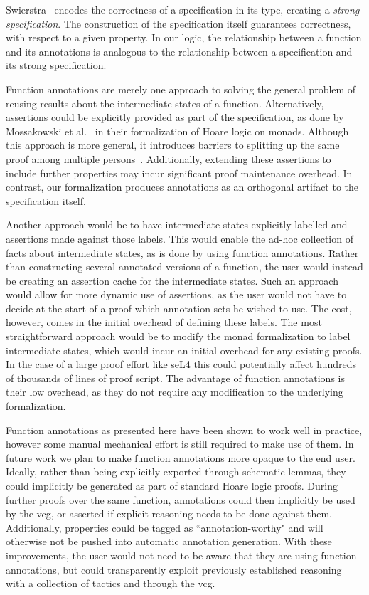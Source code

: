 \documentclass[submission]{eptcs}
\begin{document}
Swierstra~\cite{Swierstra_09} encodes the correctness of a specification in
its type, creating a \emph{strong specification}. The
construction of the specification itself guarantees
correctness, with respect to a given property. In our
logic, the relationship between a function and its annotations
is analogous to the relationship between a specification and
its strong specification.


Function annotations are merely one approach to solving the general
problem of reusing results about the intermediate states of a function.
Alternatively, assertions could be explicitly provided as part of
the specification, as done by Mossakowski et al.~\cite{Mossakowski_TSLGS_08} in their formalization of Hoare logic on monads. Although
this approach is more general, it introduces barriers
to splitting up the same proof among multiple persons~\cite{Cock_KS_08}.
Additionally, extending these assertions to include further properties
may incur significant proof maintenance overhead. In contrast,
 our formalization produces annotations as an orthogonal 
artifact to the specification itself.

Another approach would be to have intermediate states
 explicitly labelled and assertions made against those labels.
This would enable the ad-hoc collection of facts about intermediate
states, as is done by using function annotations. Rather than 
constructing several annotated versions of a function, the user
would instead be creating an assertion cache for the intermediate states.
Such an approach would allow for more dynamic use of assertions, as
the user would not have to decide at the 
start of a proof which annotation sets he wished to use.
The cost, however, comes in the initial overhead of
defining these labels. The most straightforward approach would
be to modify the monad formalization to label intermediate states, which
would incur an initial overhead for any existing proofs. In the case
of a large proof effort like seL4 this could potentially affect hundreds of thousands of 
lines of proof script.
The advantage of function annotations is their low overhead, as they do not require
any modification to the underlying formalization.


Function annotations as presented here have been shown
to work well in practice, however some manual
mechanical effort is still required to make use of them.
In future work we plan to make function annotations
more opaque to the end user. Ideally, rather than being explicitly
exported through schematic lemmas, they could implicitly be generated as part
of standard Hoare logic proofs. During further proofs
over the same function, annotations could then implicitly be used by the vcg, or asserted if explicit reasoning needs to be done against them.
Additionally, properties could be tagged as ``annotation-worthy"
and will otherwise not be pushed into automatic annotation generation.
With these improvements, the user would not need to be aware that 
they are using function annotations, but could transparently
exploit previously established reasoning with a collection of tactics and through the vcg.
\end{document}
